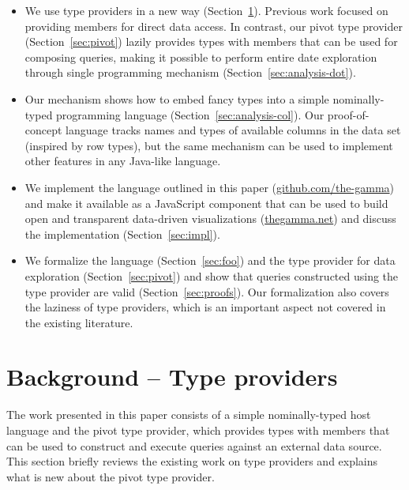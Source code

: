 \documentclass[a4paper,UKenglish]{lipics-v2016}
\begin{document}
\begin{itemize}
\item We use type providers in a new way (Section~\ref{sec:tps}). Previous work focused on providing 
  members for direct data access. In contrast, our pivot type provider (Section~\ref{sec:pivot}) lazily 
  provides types with members that can be used for composing queries, making it possible to perform
  entire date exploration through single programming mechanism (Section~\ref{sec:analysis-dot}).  

\item Our mechanism shows how to embed fancy types into a simple nominally-typed programming  
  language (Section~\ref{sec:analysis-col}). Our proof-of-concept language tracks names and types of 
  available columns in the data set (inspired by row types), but the same mechanism can be used to 
  implement other features in any Java-like language. 
  
\item We implement the language outlined in this paper (\url{github.com/the-gamma}) and make 
  it available as a JavaScript component that can be used to build open and transparent 
  data-driven visualizations (\url{thegamma.net}) and discuss the implementation (Section~\ref{sec:impl}).

\item We formalize the language (Section~\ref{sec:foo}) and the type provider for data exploration
  (Section~\ref{sec:pivot}) and show that queries constructed using the type provider are valid
  (Section~\ref{sec:proofs}). Our formalization also covers the laziness of type providers, which
  is an important aspect not covered in the existing literature.
\end{itemize}


\section{Background -- Type providers}
\label{sec:tps}

The work presented in this paper consists of a simple nominally-typed host language and the pivot
type provider, which provides types with members that can be used to construct and execute queries
against an external data source. This section briefly reviews the existing work on type providers
and explains what is new about the pivot type provider.
\end{document}
